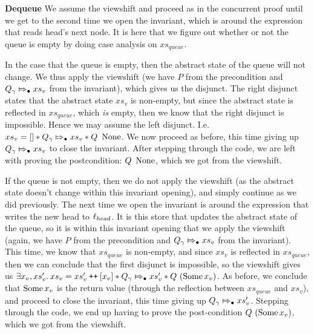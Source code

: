 \documentclass[twoside,11pt,openright]{report}
\newcommand{\Qg}{Q_\gname}
\newcommand\catenate{\mathbin{\text{\ttfamily\upshape ++}}}
\newcommand{\abstractstateauth}[2]{#1 \Mapsto_{\bullet} #2}
\begin{document}
\textbf{Dequeue} We assume the viewshift and proceed as in the concurrent proof until we get to the second time we open the invariant, which is around the expression that reads head's next node. It is here that we figure out whether or not the queue is empty by doing case analysis on $xs_{queue}$.

In the case that the queue is empty, then the abstract state of the queue will not change. We thus apply the viewshift (we have $P$ from the precondition and $\abstractstateauth{\Qg}{xs_v}$ from the invariant), which gives us the disjunct. The right disjunct states that the abstract state $xs_v$ is non-empty, but since the abstract state is reflected in $xs_{queue}$, which \emph{is} empty, then we know that the right disjunct is impossible. Hence we may assume the left disjunct. I.e. $xs_v = [] \ast \abstractstateauth{\Qg}{xs_v} \ast Q \ \None$. We now proceed as before, this time giving up $\abstractstateauth{\Qg}{xs_v}$ to close the invariant. After stepping through the code, we are left with proving the postcondition: $Q \ \operatorname{None}$, which we got from the viewshift.

If the queue is not empty, then we do not apply the viewshift (as the abstract state doesn't change within this invariant opening), and simply continue as we did previously. The next time we open the invariant is around the expression that writes the new head to $\ell_{head}$. It is this store that updates the abstract state of the queue, so it is within this invariant opening that we apply the viewshift (again, we have $P$ from the precondition and $\abstractstateauth{\Qg}{xs_v}$ from the invariant). This time, we know that $xs_{queue}$ is non-empty, and since $xs_v$ is reflected in $xs_{queue}$, then we can conclude that the first disjunct is impossible, so the viewshift gives us $\Exists x_v, xs_v' . xs_v = xs_v' \catenate [x_v] \ast \abstractstateauth{\Qg}{xs_v'} \ast Q \ (\Some{x_v})$. As before, we conclude that $\operatorname{Some}{x_v}$ is the return value (through the reflection between $xs_{queue}$ and $xs_v$), and proceed to close the invariant, this time giving up $\abstractstateauth{\Qg}{xs_v'}$. Stepping through the code, we end up having to prove the post-condition $Q \ (\operatorname{Some}{x_v})$, which we got from the viewshift.
\end{document}
